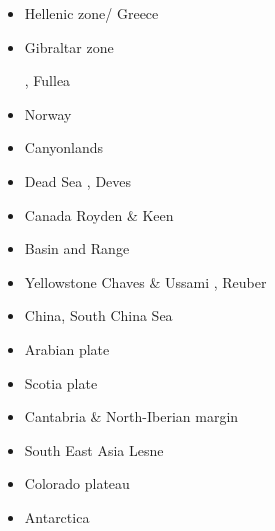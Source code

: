 \begin{itemize}
\item Hellenic zone/ Greece  
{\scriptsize
\cite{spwv88}
\cite{guhf13}
\cite{olpr14}
}
\item Gibraltar zone 
\begin{scriptsize}
\cite{gumr02}\cite{nebs02}
\cite{vanv08}
\cite{fufa10}
\cite{miab13}\cite{almb13}
\cite{medd15}, Fullea \etal \cite{furc15}
\cite{necf16}
\cite{casv19}
\cite{jitf19}
\end{scriptsize}
\item Norway 
{\scriptsize
\cite{soma13}
\cite{bubj15}
}
\item Canyonlands 
{\scriptsize
\cite{trca94}
\cite{scwa02}
\cite{grsk03}
}
\item Dead Sea 
{\scriptsize
\cite{sopg05},
Deves \etal \cite{dekk11}
}
\item Canada 
{\scriptsize
Royden \& Keen \cite{roke80}
\cite{brbw93}
\cite{pelj99}
}
\item Basin and Range 
{\scriptsize
\cite{brbe89c}
\cite{wefr09}
}
\item Yellowstone 
{\scriptsize
Chaves \& Ussami \cite{chus13},
Reuber \etal \cite{rekp18}
}

\item China, South China Sea
{\scriptsize
\cite{zhst10}
\cite{wazh15}
\cite{guyr16}
\cite{lixs19}
\cite{dawl20}
}
\item Arabian plate 
{\scriptsize
\cite{rerl15}
}
\item Scotia plate 
{\scriptsize
\cite{necb13}
\cite{vaga20}
}
\item Cantabria \& North-Iberian margin 
{\scriptsize
\cite{clbb02}
\cite{peap15}
}
\item South East Asia 
{\scriptsize
Lesne \etal \cite{lecd00}\\
\cite{rekv04}
\cite{yotr15}\cite{hasp15}\cite{meds15}
\cite{necg16}
}
\item Colorado plateau 
{\scriptsize
\cite{vabv10}
\cite{lesm11}
}
\item Antarctica  


\end{itemize}
